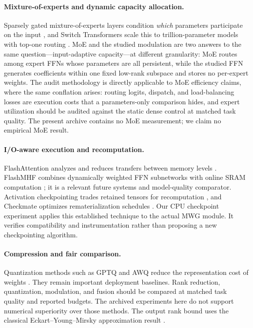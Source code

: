 \paragraph{Mixture-of-experts and dynamic capacity allocation.}
Sparsely gated mixture-of-experts layers condition \emph{which} parameters
participate on the input \citep{shazeer2017outrageously}, and Switch
Transformers scale this to trillion-parameter models with top-one routing
\citep{fedus2022switch}. MoE and the studied modulation are two answers to
the same question---input-adaptive capacity---at different granularity:
MoE routes among expert FFNs whose parameters are all persistent, while the
studied FFN generates coefficients within one fixed low-rank subspace and
stores no per-expert weights. The audit methodology is directly applicable
to MoE efficiency claims, where the same conflation arises: routing logits,
dispatch, and load-balancing losses are execution costs that a
parameters-only comparison hides, and expert utilization should be audited
against the static dense control at matched task quality. The present
archive contains no MoE measurement; we claim no empirical MoE result.

\paragraph{I/O-aware execution and recomputation.}
FlashAttention analyzes and reduces transfers between memory levels
\citep{dao2022flashattention}. FlashMHF combines dynamically weighted FFN
subnetworks with online SRAM computation \citep{zhang2025flashmhf}; it is a
relevant future systems and model-quality comparator. Activation checkpointing
trades retained tensors for recomputation \citep{chen2016checkpoint}, and
Checkmate optimizes rematerialization schedules \citep{jain2020checkmate}.
Our CPU checkpoint experiment applies this established technique to the actual
MWG module. It verifies compatibility and instrumentation rather than proposing
a new checkpointing algorithm.

\paragraph{Compression and fair comparison.}
Quantization methods such as GPTQ and AWQ reduce the representation cost of
weights \citep{frantar2023gptq,lin2024awq}. They remain important deployment
baselines. Rank reduction, quantization, modulation, and fusion should be
compared at matched task quality and reported budgets. The archived experiments
here do not support numerical superiority over those methods. The output
rank bound uses the classical Eckart--Young--Mirsky approximation result
\citep{eckart1936approximation,mirsky1960norm}.

